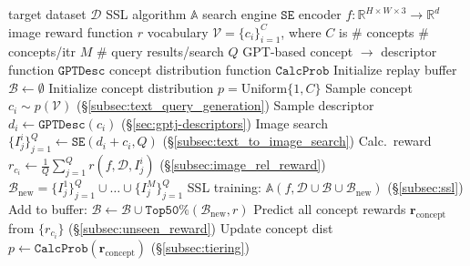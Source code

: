 \begin{algorithm}[t]
    \caption{$\texttt{Internet Explorer}$}
    \label{alg:internet_explorer}
\begin{algorithmic}[1]
    \Statex \quad target dataset $\mathcal D$
    \Statex \quad SSL algorithm $\mathbb{A}$
    \Statex \quad search engine $\texttt{SE}$
    \Statex \quad encoder $f: \mathbb{R}^{H \times W \times 3} \rightarrow \mathbb{R}^d$
    \Statex \quad image reward function $r$
    \Statex \quad vocabulary $\mathcal V = \{c_i\}_{i=1}^C$, where $C$ is $\#$ concepts
    \Statex \quad $\#$ concepts/itr $M$
    \Statex \quad $\#$ query results/search $Q$
    \Statex \quad GPT-based concept $\rightarrow$ descriptor function $\texttt{GPTDesc}$
    \Statex \quad concept distribution function $\texttt{CalcProb}$
    \State Initialize replay buffer $\mathcal{B} \leftarrow \emptyset$
    \State Initialize concept distribution $p = \text{Uniform}\{1, C\}$
            \State Sample concept $c_i \sim p(\mathcal{V})$ \hfill (\S\ref{subsec:text_query_generation})
            \State Sample descriptor $d_i \gets \texttt{GPTDesc}(c_i)$ \hfill (\S\ref{sec:gptj-descriptors})
            \State Image search $\{I_j^i\}_{j=1}^Q  \leftarrow \texttt{SE}(d_i + c_i, Q)$ \hfill (\S\ref{subsec:text_to_image_search})
            \State Calc.\ reward $r_{c_i} \gets \frac 1 Q \sum_{j=1}^Q r(f, \mathcal D, I_j^i)$ \hfill (\S\ref{subsec:image_rel_reward})
        \EndFor
        \State $\mathcal B_{\text{new}} = \{I_j^1\}_{j=1}^Q \cup \dots \cup \{I_j^M\}_{j=1}^Q$
        \State SSL training: $\mathbb{A}(f, \mathcal D \cup \mathcal B \cup \mathcal B_{\text{new}})$ \hfill (\S\ref{subsec:ssl})
        \State Add to buffer: $\mathcal{B} \leftarrow \mathcal{B} \cup \texttt{Top50\%}(\mathcal B_{\text{new}}, r)$  %
        \State Predict all concept rewards $\mathbf{r}_{\text{concept}}$ from $\{r_{c_i}\}$ \hfill (\S\ref{subsec:unseen_reward})
        \State Update concept dist $p \leftarrow \texttt{CalcProb}(\mathbf{r}_{\text{concept}})$ \hfill (\S\ref{subsec:tiering})
    \EndFor
\end{algorithmic}
\end{algorithm}

